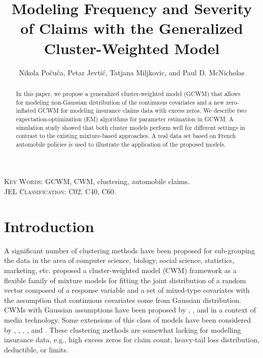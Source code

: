 \documentclass[11pt,letterpaper]{article}
\numberwithin{equation}{section}
\numberwithin{equation}{section}
\numberwithin{equation}{section}
\begin{document}
\title{Modeling  Frequency and Severity of Claims with the Generalized  Cluster-Weighted Model}

\author{Nikola Po\v cu\v ca,  Petar Jevti\' c, Tatjana Miljkovic, and Paul D. McNicholas}

\maketitle
\doublespacing
\small

\begin{abstract}

In this paper, we propose a generalized cluster-weighted model (GCWM) that allows for modeling non-Gaussian distribution of the continuous covariates and a new zero-inflated GCWM for modeling insurance claims data with excess zeros. We describe two expectation-optimization (EM) algorithms for parameter estimation in GCWM. A simulation study showed that both cluster models perform well for different settings in contrast to the existing mixture-based approaches. A real data set based on French automobile policies is used to illustrate the application of the proposed models.

\end{abstract}
\textsc{Key Words:} GCWM, CWM, clustering, automobile claims.\\
\textsc{JEL Classification:}  C02, C40, C60.\\
\section{Introduction}\label{sec:introduction}
A significant number of clustering methods have been proposed for sub-grouping the data in the area of computer science, biology, social science, statistics, marketing, etc. \cite{Ingrassia+Punzo+Vittadini+Minotti:2015} proposed a cluster-weighted model (CWM) framework as a flexible family of mixture models for fitting the joint distribution of a random vector composed of a response variable and a set of mixed-type covariates with the assumption that continuous covariates come from Gaussian distribution. CWMs with Gaussian assumptions have been proposed by \cite{Gershenfeld:1997}, \cite{Gershenfeld:Schoner+Metois:1999}, and \cite{Gershenfeld:1999} in a context of media technology. Some extensions of this class of models have been considered by \cite{Punzo+Ingrassia:2015}, \cite{Ingrassia+Minotti+Punzo:2014}, \cite{Ingrassia+Minotti+Vittadini:2012}, \cite{subedi13,subedi15}, and \cite{punzo17}. These clustering methods are somewhat lacking for modelling insurance data, e.g., high excess zeros for claim count, heavy-tail loss distribution, deductible, or limits.
\end{document}
